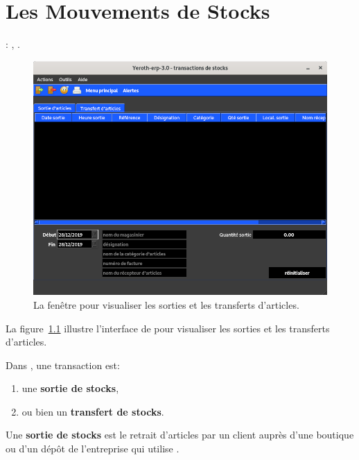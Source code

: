 \chapter{Les Mouvements de Stocks}\label{chap:mouvements-de-stocks}

\utilisateurs: \lienmagasinier, \lienmanager.\\



\begin{figure}[!htbp]
	\centering
	\includegraphics[scale=0.45]{images/yeren-transactions.png}
	\caption{La fen\^etre pour visualiser les sorties et les
		transferts d'articles.}
	\label{fig:yeren-transactions}
\end{figure}

La figure~\ref{fig:yeren-transactions} illustre
l'interface de \yeroth pour visualiser les sorties et les
transferts d'articles.

Dans \yeroth, une transaction est:
\begin{enumerate}[1)]
	\item une \textbf{sortie de stocks},
	\item ou bien un \textbf{transfert de stocks}.\\
\end{enumerate}

Une \textbf{sortie de stocks} est le retrait d'articles
par un client aupr\`es d'une boutique ou d'un d\'ep\^ot
de l'entreprise qui utilise \yeroth.

